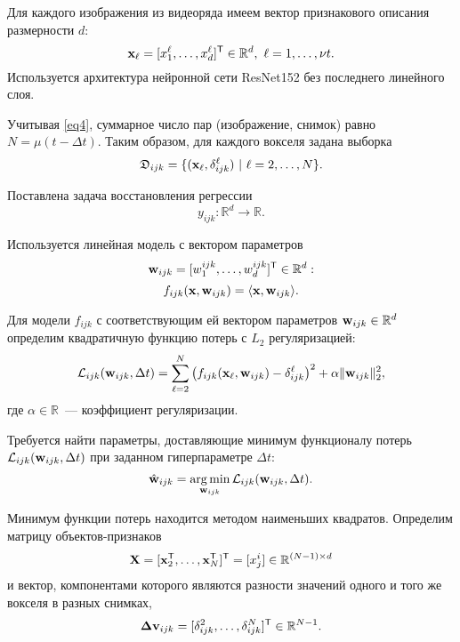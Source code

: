 \documentclass[a4paper, 12pt]{article}
\begin{document}
	Для каждого изображения из видеоряда имеем вектор признакового описания размерности $d$:
	\[ \mathbf{x}_{\ell} = [x^{\ell}_1, \ldots, x^{\ell}_{d}]^{\mathsf{T}} \in \mathbb{R}^{d}, \ {\ell} = 1, \ldots, \nu t. \]
	Используется архитектура нейронной сети ResNet152 без последнего линейного слоя.

	Учитывая \eqref{eq4}, суммарное число пар (изображение, снимок) 
	равно $N = \mu (t - \Delta t)$. Таким образом, для каждого вокселя задана выборка
	\[ \mathfrak{D}_{ijk} = \{(\mathbf{x}_{\ell}, \delta^{\ell}_{ijk}) \ | \ {\ell} = 2, \ldots, N \}. \]

	Поставлена задача восстановления регрессии
	\begin{equation}
		\label{eq6}
		y_{ijk}: \mathbb{R}^{d} \to \mathbb{R}.
	\end{equation}
		
	Используется линейная модель с вектором параметров 
	\[ \mathbf{w}_{ijk} = [w^{ijk}_1, \ldots, w^{ijk}_{d}]^{\mathsf{T}} \in \mathbb{R}^{d}: \]
	\begin{equation}
		\label{eq7}
		f_{ijk}(\mathbf{x}, \mathbf{w}_{ijk}) = \langle \mathbf{x}, \mathbf{w}_{ijk} \rangle.
	\end{equation}

	Для модели $f_{ijk}$ с соответствующим ей вектором параметров $\mathbf{w}_{ijk} \in \mathbb{R}^{d}$
	определим квадратичную функцию потерь с $L_2$ регуляризацией:
	\begin{equation}
		\label{eq8}
		\mathcal{L}_{ijk}(\mathbf{w}_{ijk}, \Delta t) = \sum\limits_{\ell = 2}^{N} \big(f_{ijk}(\mathbf{x}_{\ell}, \mathbf{w}_{ijk}) - \delta^{\ell}_{ijk}\big)^2 + \alpha \| \mathbf{w}_{ijk} \|_2^2,
	\end{equation}
	где $\alpha \in \mathbb{R}$~--- коэффициент регуляризации.

	Требуется найти параметры, доставляющие минимум функционалу потерь $\mathcal{L}_{ijk}(\mathbf{w}_{ijk}, \Delta t)$
	при заданном гиперпараметре $\Delta t$:
	\begin{equation}
		\label{eq9}
		\hat{\mathbf{w}}_{ijk} = \operatorname*{arg\,min}_{\mathbf{w}_{ijk}} \mathcal{L}_{ijk}(\mathbf{w}_{ijk}, \Delta t).
	\end{equation}

	Минимум функции потерь находится методом наименьших квадратов. Определим матрицу объектов-признаков
	\begin{equation}
		\label{eq10}
		\mathbf{X} = [\mathbf{x}_2^{\mathsf{T}}, \ldots, \mathbf{x}_N^{\mathsf{T}}]^{\mathsf{T}} = [x^i_j] \in \mathbb{R}^{(N-1) \times d}
	\end{equation}
	и вектор, компонентами которого являются разности значений одного и того же вокселя в разных снимках,
	\begin{equation}
		\label{eq11}
		\mathbf{\Delta v}_{ijk} = [\delta^2_{ijk}, \ldots, \delta^N_{ijk}]^{\mathsf{T}} \in \mathbb{R}^{N-1}.
	\end{equation}
\end{document}
